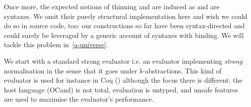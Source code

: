 Once more, the expected notions of thinning  and
 are induced as  and  are syntaxes.
We omit their purely
structural implementation here and wish we could do so in source code,
too: our constructions so far have been syntax-directed and could
surely be leveraged by a generic account of syntaxes with binding.
We will tackle this problem in~\cref{a-universe}.

We start with a standard strong evaluator i.e. an evaluator implementing
\emph{strong} normalisation in the sense that it goes under λ-abstractions.
This kind of evaluator is used for instance in Coq
(\cite{DBLP:conf/icfp/GregoireL02,DBLP:conf/cpp/BoespflugDG11})
although the focus there is different: the host language (OCaml)  is not
total, evaluation is untyped, and unsafe features are used to maximise
the evaluator's performance.






